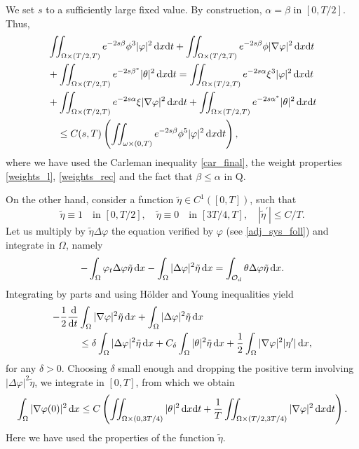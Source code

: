 \documentclass{dcds-bOF}
\theoremstyle{definition}
\def\dx{\,\textnormal{d}x}
\def\dt{\textnormal{d}t}
\def\d{\,\textnormal{d}}
\begin{document}
We set $s$ to a sufficiently large fixed value. By construction, $\alpha=\beta$ in $[0,T/2]$. Thus,
%
\begin{align} \notag
&\iint_{\Omega\times(T/2,T)}e^{-2s\beta}\phi^3|\varphi|^2\dx\dt+\iint_{\Omega\times(T/2,T)}e^{-2s\beta}\phi|\nabla \varphi|^2\dx\dt \\ \notag
&+\iint_{\Omega\times(T/2,T)}e^{-2s\beta^*}|\theta|^2\dx\dt = \iint_{\Omega\times(T/2,T)}e^{-2s\alpha}\xi^3|\varphi|^2\dx\dt \\ \notag
&+ \iint_{\Omega\times(T/2,T)}e^{-2s\alpha}\xi|\nabla\varphi|^2\dx\dt + \iint_{\Omega\times(T/2,T)}e^{-2s\alpha^*}|\theta|^2\dx\dt \\ \label{car_rec}
&\quad \leq  C(s,T)\left(\iint_{\omega\times(0,T)}e^{-2s\beta}\phi^5|\varphi|^2\dx\dt\right),
\end{align}
%
where we have used the Carleman inequality \eqref{car_final}, the weight properties \eqref{weights_l}, \eqref{weights_rec} and the fact that $\beta\leq \alpha$ in Q.

On the other hand, consider a function $\tilde \eta\in C^1([0,T])$, such that
%
\begin{equation*}
\tilde\eta \equiv 1 \quad\text{in } [0,T/2], \quad \tilde\eta\equiv 0 \quad \text{in } [3T/4,T], \quad |\tilde\eta^\prime|\leq C/T.
\end{equation*}
%
Let us multiply by $\tilde\eta\Delta\varphi$ the equation verified by $\varphi$ (see \eqref{adj_sys_foll}) and integrate in $\Omega$, namely
%
\begin{equation*}
-\int_{\Omega}\varphi_t\Delta\varphi\tilde\eta\dx-\int_{\Omega}|\Delta \varphi|^2\tilde\eta\dx=\int_{\mathcal O_d}\theta\Delta\varphi\tilde \eta\dx.
\end{equation*}
%
Integrating by parts and using H\"older and Young inequalities yield
%
\begin{equation*}
\begin{split}
-\frac{1}{2}\frac{\d}{\dt}&\int_{\Omega}|\nabla\varphi|^2\tilde\eta\dx+\int_{\Omega}|\Delta\varphi|^2\tilde\eta\dx\\
&\leq \delta \int_{\Omega}|\Delta\varphi|^2\tilde\eta\dx+C_\delta\int_{\Omega}|\theta|^2\tilde\eta\dx+\frac{1}{2}\int_{\Omega}|\nabla\varphi|^2|\eta^\prime|\dx,
\end{split}
\end{equation*}
%
for any $\delta>0$.  Choosing $\delta$ small enough and dropping the positive term involving $|\Delta\varphi|^2\tilde\eta$, we integrate in $[0,T]$, from which we obtain
%
\begin{equation}\label{nabla_theta_0}
\int_{\Omega}|\nabla\varphi(0)|^2\dx\leq C\left(\iint_{\Omega\times(0,3T/4)}|\theta|^2\dx\dt+\frac{1}{T}\iint_{\Omega\times(T/2,3T/4)}|\nabla\varphi|^2\dx\dt\right).
\end{equation}
%
Here we have used the properties of the function $\tilde\eta$.
\end{document}
